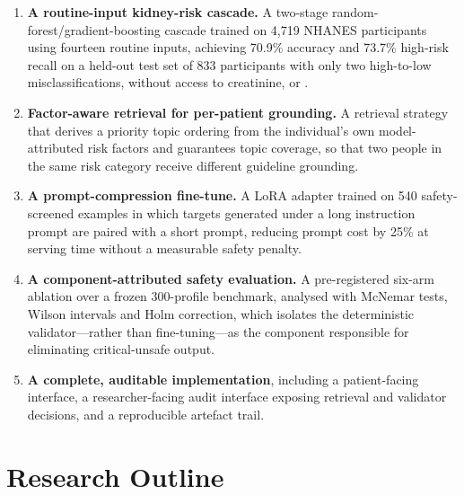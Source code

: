 \begin{enumerate}
  \item \textbf{A routine-input kidney-risk cascade.} A two-stage
        random-forest/gradient-boosting cascade trained on 4{,}719 NHANES
        participants using fourteen routine inputs, achieving 70.9\% accuracy
        and 73.7\% high-risk recall on a held-out test set of 833 participants
        with only two high-to-low misclassifications, without access to
        creatinine, \eGFR{} or \UACR.
  \item \textbf{Factor-aware retrieval for per-patient grounding.} A retrieval
        strategy that derives a priority topic ordering from the individual's own
        model-attributed risk factors and guarantees topic coverage, so that two
        people in the same risk category receive different guideline grounding.
  \item \textbf{A prompt-compression fine-tune.} A LoRA adapter trained on
        540 safety-screened examples in which targets generated under a long
        instruction prompt are paired with a short prompt, reducing prompt cost
        by 25\% at serving time without a measurable safety penalty.
  \item \textbf{A component-attributed safety evaluation.} A pre-registered
        six-arm ablation over a frozen 300-profile benchmark, analysed with
        McNemar tests, Wilson intervals and Holm correction, which isolates the
        deterministic validator---rather than fine-tuning---as the component
        responsible for eliminating critical-unsafe output.
  \item \textbf{A complete, auditable implementation}, including a
        patient-facing interface, a researcher-facing audit interface exposing
        retrieval and validator decisions, and a reproducible artefact trail.
\end{enumerate}

\section{Research Outline}
\label{sec:outline}

